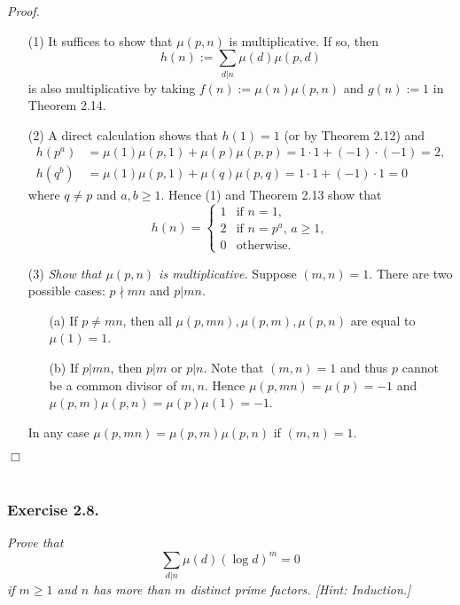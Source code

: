 \documentclass{article}
\begin{document}
\emph{Proof.}
\begin{enumerate}
\item[(1)]
  It suffices to show that $\mu(p,n)$ is multiplicative.
  If so, then
  \[
    h(n) := \sum_{d|n} \mu(d)\mu(p,d)
  \]
  is also multiplicative
  by taking $f(n) := \mu(n)\mu(p,n)$ and $g(n) := 1$ in Theorem 2.14.

\item[(2)]
  A direct calculation shows that $h(1) = 1$ (or by Theorem 2.12) and
  \begin{align*}
    h(p^a) &= \mu(1)\mu(p,1) + \mu(p)\mu(p,p) = 1 \cdot 1 + (-1) \cdot (-1) = 2, \\
    h(q^b) &= \mu(1)\mu(p,1) + \mu(q)\mu(p,q) = 1 \cdot 1 + (-1) \cdot 1 = 0
  \end{align*}
  where $q \neq p$ and $a, b \geq 1$.
  Hence (1) and Theorem 2.13 show that
  \begin{equation*}
    h(n) =
    \begin{cases}
      1 & \text{if $n = 1$}, \\
      2 & \text{if $n = p^a$, $a \geq 1$}, \\
      0 & \text{otherwise}.
    \end{cases}
  \end{equation*}

\item[(3)]
  \emph{Show that $\mu(p,n)$ is multiplicative.}
  Suppose $(m,n) = 1$.
  There are two possible cases: $p \nmid mn$ and $p|mn$.
  \begin{enumerate}
  \item[(a)]
    If $p \neq mn$, then all $\mu(p,mn), \mu(p,m), \mu(p,n)$ are equal to $\mu(1) = 1$.

  \item[(b)]
    If $p | mn$, then $p|m$ or $p|n$.
    Note that $(m,n) = 1$ and thus $p$ cannot be a common divisor of $m, n$.
    Hence $\mu(p,mn) = \mu(p) = -1$ and $\mu(p,m)\mu(p,n) = \mu(p)\mu(1) = -1$.
  \end{enumerate}
  In any case $\mu(p,mn) = \mu(p,m)\mu(p,n)$ if $(m,n) = 1$.
\end{enumerate}
$\Box$ \\\\






\subsubsection*{Exercise 2.8.}
\emph{Prove that
\[
  \sum_{d|n} \mu(d) (\log d)^m = 0
\]
if $m \geq 1$ and $n$ has more than $m$ distinct prime factors.
[Hint: Induction.]} \\
\end{document}
